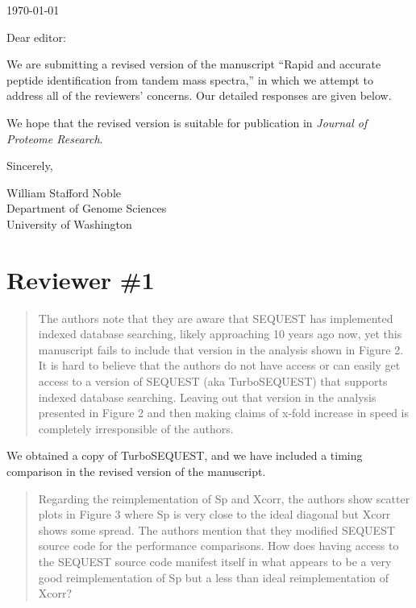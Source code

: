 \documentclass{article}
\newcommand{\breview}{\begin{quotation}\begin{em}\noindent}
\newcommand{\ereview}{\end{em}\end{quotation}}
\begin{document}
\hspace*{3.0in}\today

\vspace*{3ex}

\noindent
Dear editor:

\vspace*{1ex}

We are submitting a revised version of the manuscript ``Rapid and
accurate peptide identification from tandem mass spectra,'' in which
we attempt to address all of the reviewers' concerns.  Our detailed
responses are given below.

We hope that the revised version is suitable for publication in {\em
Journal of Proteome Research}.

\vspace*{1ex}

\noindent
Sincerely,

\hspace*{1ex}

\noindent
William Stafford Noble\\
Department of Genome Sciences\\
University of Washington


\section*{Reviewer \#1}

\breview The authors note that they are aware that SEQUEST has
implemented indexed database searching, likely approaching 10 years
ago now, yet this manuscript fails to include that version in the
analysis shown in Figure 2.  It is hard to believe that the authors do
not have access or can easily get access to a version of SEQUEST (aka
TurboSEQUEST) that supports indexed database searching.  Leaving out
that version in the analysis presented in Figure 2 and then making
claims of x-fold increase in speed is completely irresponsible of the
authors. \ereview

We obtained a copy of TurboSEQUEST, and we have included a timing
comparison in the revised version of the manuscript.

\breview Regarding the reimplementation of Sp and Xcorr, the authors
show scatter plots in Figure 3 where Sp is very close to the ideal
diagonal but Xcorr shows some spread.  The authors mention that they
modified SEQUEST source code for the performance comparisons.  How
does having access to the SEQUEST source code manifest itself in what
appears to be a very good reimplementation of Sp but a less than ideal
reimplementation of Xcorr? \ereview
\end{document}
